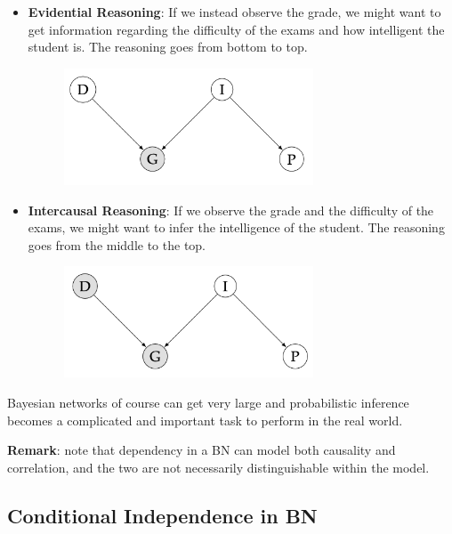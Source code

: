 \begin{exampleblock}
\begin{itemize}
\begin{figure}[H]
        \end{figure}
        \item \textbf{Evidential Reasoning}: If we instead observe the grade, we might want to get information
        regarding the diﬃculty of the exams and how intelligent the student
        is. The reasoning goes from bottom to top.
        \begin{figure}[H]
            \centering
            \includegraphics[width=0.7\textwidth]{assets/fig6.png}
        \end{figure}
        \item \textbf{Intercausal Reasoning}: If we observe the grade and the diﬃculty of the exams, we
        might want to infer the intelligence of the student. The reasoning
        goes from the middle to the top.
        \begin{figure}[H]
            \centering
            \includegraphics[width=0.7\textwidth]{assets/fig7.png}
        \end{figure}
    \end{itemize}
    Bayesian networks of course can get very large and probabilistic inference
    becomes a complicated and important task to perform in the real world.
    
    \textbf{Remark}: note that dependency in a BN can model both causality and
    correlation, and the two are not necessarily distinguishable within the
    model.
\end{exampleblock}


\newpage
\subsection{Conditional Independence in BN}

